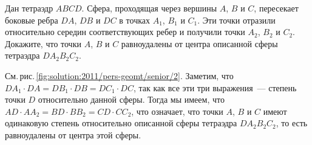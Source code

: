 \problem
Дан тетраэдр $ABCD$.
Сфера, проходящая через вершины $A$, $B$ и $C$, пересекает боковые ребра
$DA$, $DB$ и $DC$ в точках $A_1$, $B_1$ и $C_1$.
Эти точки отразили относительно середин соответствующих ребер и получили точки
$A_2$, $B_2$ и $C_2$.
Докажите, что точки $A$, $B$ и $C$ равноудалены от центра описанной
сферы тетраэдра $D A_2 B_2 C_2$.

%
\label{solution:2011/pers-geomt/senior/2}%
См.\,рис.\,\ref{fig:solution:2011/pers-geomt/senior/2}.
Заметим, что $D A_1 \cdot DA = D B_1 \cdot DB = D C_1 \cdot DC$, так как все
эти три выражения~--- степень точки $D$ относительно данной сферы.
Тогда мы имеем, что
$AD \cdot A A_2 = BD \cdot B B_2 = CD \cdot C C_2$,
что означает, что точки $A$, $B$ и $C$ имеют одинаковую степень относительно
описанной сферы тетраэдра $D A_2 B_2 C_2$, то есть равноудалены от центра этой
сферы.

\endproblem
